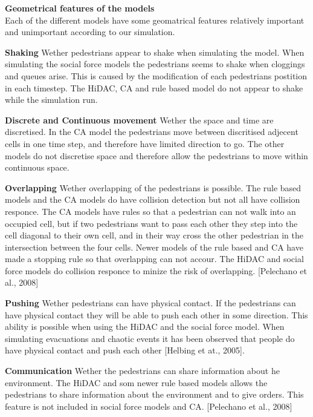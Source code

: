 \textbf{Geometrical features of the models}\\
Each of the different models have some geomatrical features relatively important and unimportant according to our simulation.

\textbf{Shaking} Wether pedestrians appear to shake when simulating the model.
When simulating the social force models the pedestrians seems to shake when cloggings and queues arise. This is caused by the modification
of each pedestrians postition in each timestep. 
The HiDAC, CA and rule based model do not appear to shake while the simulation run.

\textbf{Discrete and Continuous movement} Wether the space and time are discretised. In the CA model the pedestrians move between discritised adjecent
cells in one time step, and therefore have limited direction to go. The other models do not discretise space and therefore allow the pedestrians to move
within continuous space.
 
\textbf{Overlapping} Wether overlapping of the pedestrians is possible. The rule based models and the CA models do have collision detection but not
all have collision responce. The CA models have rules so that a pedestrian can not walk into an occupied cell, but if two pedestrians want to pass each
other they step into the cell diagonal to their own cell, and in their way cross the other pedestrian in the intersection between the four cells.
Newer models of the rule based and CA have made a stopping rule so that overlapping can not accour. The HiDAC and social force models do collision responce
to minize the risk of overlapping. [Pelechano et al., 2008]

\textbf{Pushing} Wether pedestrians can have physical contact. If the pedestrians can have physical contact they will be able to push each other in some
direction. This ability is possible when using the HiDAC and the social force model. When simulating evacuations and chaotic events it has been observed
that people do have physical contact and push each other [Helbing et at., 2005].

\textbf{Communication} Wether the pedestrians can share information about he environment. The HiDAC and som newer rule based models allows the pedestrians
to share information about the environment and to give orders. This feature is not included in social force models and CA. [Pelechano et al., 2008]

